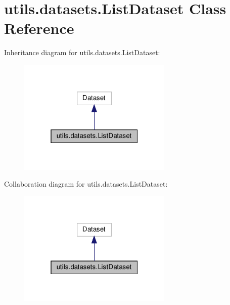 \hypertarget{classutils_1_1datasets_1_1ListDataset}{}\section{utils.\+datasets.\+List\+Dataset Class Reference}
\label{classutils_1_1datasets_1_1ListDataset}


Inheritance diagram for utils.\+datasets.\+List\+Dataset\+:
\nopagebreak
\begin{figure}[H]
\begin{center}
\leavevmode
\includegraphics[width=208pt]{classutils_1_1datasets_1_1ListDataset__inherit__graph}
\end{center}
\end{figure}


Collaboration diagram for utils.\+datasets.\+List\+Dataset\+:
\nopagebreak
\begin{figure}[H]
\begin{center}
\leavevmode
\includegraphics[width=208pt]{classutils_1_1datasets_1_1ListDataset__coll__graph}
\end{center}
\end{figure}
